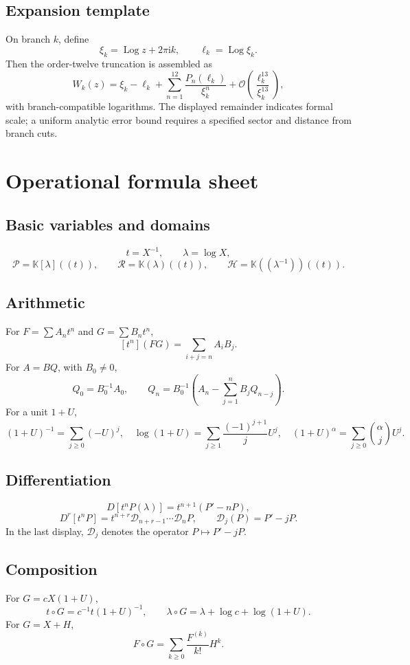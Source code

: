 \documentclass[11pt,openany]{book}
\theoremstyle{definition}
\theoremstyle{plain}
\theoremstyle{remark}
\newcommand{\K}{\mathbb{K}}
\newcommand{\Plog}{\mathscr{P}}
\newcommand{\Rlog}{\mathscr{R}}
\newcommand{\Hlog}{\mathscr{H}}
\newcommand{\ii}{\mathrm{i}}
\newcommand{\bigO}{\mathcal{O}}
\DeclareMathOperator{\Log}{Log}
\begin{document}
\section{Expansion template}
On branch \(k\), define
\[
 \xi_k=\Log z+2\pi\ii k,
 \qquad
 \ell_k=\Log\xi_k.
\]
Then the order-twelve truncation is assembled as
\begin{equation}\label{eq:order12-template}
 W_k(z)=\xi_k-\ell_k+
 \sum_{n=1}^{12}\frac{P_n(\ell_k)}{\xi_k^n}
 +\bigO\left(\frac{\ell_k^{13}}{\xi_k^{13}}\right),
\end{equation}
with branch-compatible logarithms. The displayed remainder indicates formal scale; a uniform analytic error bound requires a specified sector and distance from branch cuts.

\chapter{Operational formula sheet}\label{app:formula-sheet}

\section{Basic variables and domains}
\[
 t=X^{-1},\qquad \lambda=\log X,
\]
\[
 \Plog=\K[\lambda]((t)),\qquad
 \Rlog=\K(\lambda)((t)),\qquad
 \Hlog=\K((\lambda^{-1}))((t)).
\]

\section{Arithmetic}
For \(F=\sum A_nt^n\) and \(G=\sum B_nt^n\),
\[
 [t^n](FG)=\sum_{i+j=n}A_iB_j.
\]
For \(A=BQ\), with \(B_0\ne0\),
\[
 Q_0=B_0^{-1}A_0,
 \qquad
 Q_n=B_0^{-1}\left(A_n-\sum_{j=1}^{n}B_jQ_{n-j}\right).
\]
For a unit \(1+U\),
\[
 (1+U)^{-1}=\sum_{j\ge0}(-U)^j,
 \quad
 \log(1+U)=\sum_{j\ge1}\frac{(-1)^{j+1}}jU^j,
 \quad
 (1+U)^\alpha=\sum_{j\ge0}\binom\alpha jU^j.
\]

\section{Differentiation}
\[
 D[t^nP(\lambda)]=t^{n+1}(P'-nP),
\]
\[
 D^r[t^nP]
 =t^{n+r}\mathcal D_{n+r-1}\cdots\mathcal D_nP,
 \qquad \mathcal D_j(P)=P'-jP.
\]
In the last display, \(\mathcal D_j\) denotes the operator \(P\mapsto P'-jP\).

\section{Composition}
For \(G=cX(1+U)\),
\[
 t\circ G=c^{-1}t(1+U)^{-1},
 \qquad
 \lambda\circ G=\lambda+\log c+\log(1+U).
\]
For \(G=X+H\),
\[
 F\circ G=\sum_{k\ge0}\frac{F^{(k)}}{k!}H^k.
\]
\end{document}
